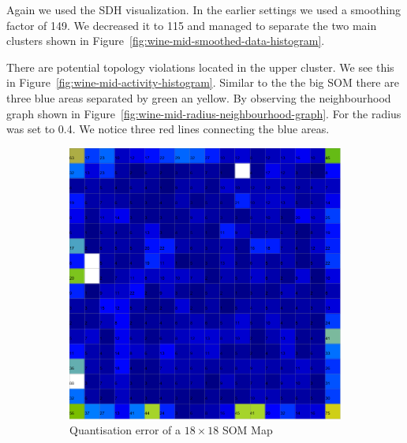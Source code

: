 \documentclass{acm_proc_article-sp}
\begin{document}
Again we used the SDH visualization. In the earlier settings we used a smoothing factor of 149. We decreased it to
115 and managed to separate the two main clusters shown in Figure~\ref{fig:wine-mid-smoothed-data-histogram}.

There are potential topology violations located in the upper cluster. We see this in Figure~\ref{fig:wine-mid-activity-histogram}.
Similar to the the big SOM there are three blue areas separated by green an yellow. By observing the neighbourhood graph
shown in Figure~\ref{fig:wine-mid-radius-neighbourhood-graph}. For the radius was set to 0.4. We notice three red lines connecting the blue areas.


\begin{figure}
\centering
\begin{subfigure}[b]{0.45\linewidth}
    \includegraphics[width=\linewidth]{img/wine-mid-quant-error}
    \caption{Quantisation error of a $18\times18$ SOM Map}
    \label{fig:wine-mid-quant-error}
\end{subfigure}
\begin{subfigure}[b]{0.45\linewidth}

\end{subfigure}
\end{figure}
\end{document}
